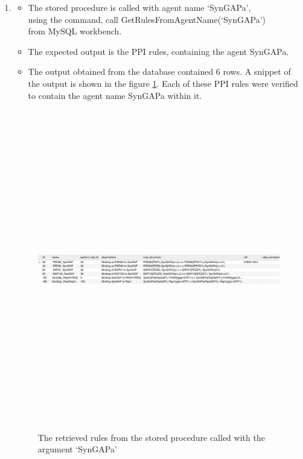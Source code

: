 \documentclass[msc,deptreport,ai]{infthesis}      %
\begin{document}
\begin{enumerate}
	\item 
	\begin{itemize}
		\item 	The stored procedure is called with agent name `SynGAPa',\\
		using the command, call GetRulesFromAgentName(`SynGAPa')\\
		from MySQL workbench.
		\item The expected output is the PPI rules, containing the agent SynGAPa.
		\item The output obtained from the database contained 6 rows. A snippet of the output is shown in the figure \ref{fig:AgentNameOutput2}. Each of these PPI rules were verified to contain the agent name SynGAPa within it.
	\end{itemize}
		\begin{figure}[H]
		\centering
		\captionsetup{justification=centering}
		\includegraphics[width=\linewidth,height=14cm,keepaspectratio]{AgentNameOutput2.png}	
		\caption{The retrieved rules from the stored procedure called with the argument `SynGAPa'}
		\label{fig:AgentNameOutput2}		
	\end{figure}
\end{enumerate}
\end{document}
